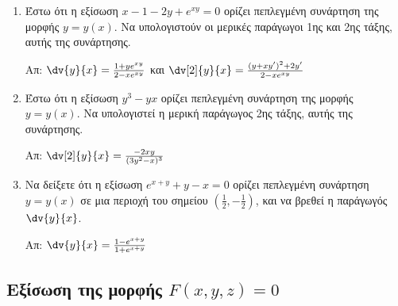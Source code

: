 \begin{enumerate}
    \item Έστω ότι η εξίσωση $ x-1-2y+e^{xy} = 0 $ ορίζει πεπλεγμένη συνάρτηση της 
        μορφής $ y = y(x) $. Να υπολογιστούν οι μερικές παράγωγοι 
        1ης και 2ης τάξης, αυτής της συνάρτησης.

        \hfill Απ: $ \dv{y}{x} = \frac{1+ye^{xy}}{2-xe^{xy}} $ και $ \dv[2]{y}{x}
        = \frac{(y+xy')^{2}+2y'}{2-xe^{xy}} $ 

    \item Έστω ότι η εξίσωση $ y^{3} - yx $ ορίζει πεπλεγμένη συνάρτηση της 
        μορφής $ y = y(x) $. Να υπολογιστεί η μερική παράγωγος 2ης τάξης, αυτής 
        της συνάρτησης.

        \hfill Απ: $ \dv[2]{y}{x} = \frac{ -2xy }{ (3y^{2} - x)^{3} }  $ 

    \item Να δείξετε ότι η εξίσωση $ e^{x+y} + y- x = 0 $ ορίζει πεπλεγμένη συνάρτηση 
        $ y=y(x) $ σε μια περιοχή του σημείου $ \left(\frac{1}{2}, - 
        \frac{1}{2}\right) $, και να βρεθεί η παράγωγός $ \dv{y}{x} $.

        \hfill Απ: $ \dv{y}{x} = \frac{1-e^{x+y}}{1+e^{x+y}} $  
\end{enumerate}

\subsection{Εξίσωση της μορφής \ensuremath{F(x,y,z)=0}}


